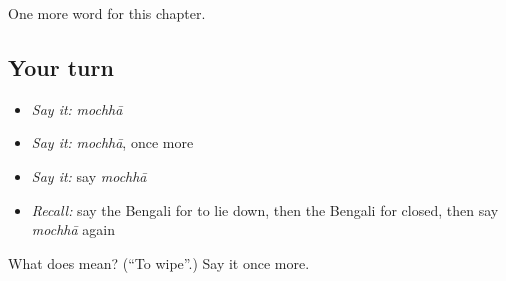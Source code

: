 \begin{grammarlens}[title={What you've built}]
One more word for this chapter.
\end{grammarlens}

\subsection*{Your turn}
\begin{itemize}
\raggedright
  \item \emph{Say it:} \emph{mochhā}
  \item \emph{Say it:} \emph{mochhā}, once more
  \item \emph{Say it:} say \emph{mochhā}
  \item \emph{Recall:} say the Bengali for to lie down, then the Bengali for closed, then say \emph{mochhā} again
\end{itemize}

\begin{tcolorbox}[breakable,colback=teal!4,colframe=teal!35!black,title={Before you move on}]
What does  mean? (\textquotedblleft{}To wipe\textquotedblright{}.) Say it once more.
\end{tcolorbox}
